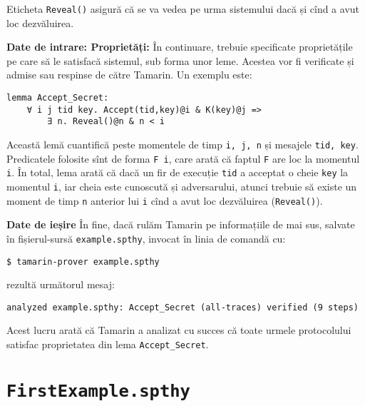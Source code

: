 Eticheta \texttt{Reveal()} asigură că se va vedea pe urma sistemului
dacă și cînd a avut loc dezvăluirea.

\textbf{Date de intrare: Proprietăți:} În continuare, trebuie
specificate proprietățile pe care să le satisfacă sistemul, sub
forma unor leme. Acestea vor fi verificate și admise sau respinse
de către Tamarin. Un exemplu este:

\begin{verbatim}
lemma Accept_Secret:
    ∀ i j tid key. Accept(tid,key)@i & K(key)@j =>
        ∃ n. Reveal()@n & n < i
\end{verbatim}

Această lemă cuantifică peste momentele de timp \texttt{i, j, n} și mesajele
\texttt{tid, key}. Predicatele folosite sînt de forma \texttt{F \@ i}, care
arată că faptul \texttt{F} are loc la momentul \texttt{i}. În total, lema
arată că dacă un fir de execuție \texttt{tid} a acceptat o cheie \texttt{key}
la momentul \texttt{i}, iar cheia este cunoscută și adversarului, atunci
trebuie să existe un moment de timp \texttt{n} anterior lui \texttt{i} cînd
a avut loc dezvăluirea (\texttt{Reveal()}).

\textbf{Date de ieșire} În fine, dacă rulăm Tamarin pe informațiile
de mai sus, salvate în fișierul-sursă \texttt{example.spthy}, invocat în
linia de comandă cu:
\begin{verbatim}
$ tamarin-prover example.spthy
\end{verbatim}
rezultă următorul mesaj:

\begin{verbatim}
analyzed example.spthy: Accept_Secret (all-traces) verified (9 steps)
\end{verbatim}

Acest lucru arată că Tamarin a analizat cu succes că toate urmele protocolului
satisfac proprietatea din lema \texttt{Accept\_Secret}.

\section{\texttt{FirstExample.spthy}}

